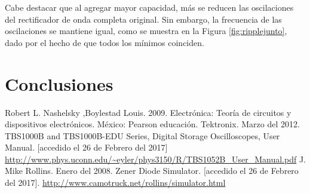 \documentclass[twoside,twocolumn,a4paper]{article}
\begin{document}
Cabe destacar que al agregar mayor capacidad, m\'as se reducen las oscilaciones del rectificador de onda completa original. Sin embargo, la frecuencia de las oscilaciones se mantiene igual, como se muestra en la Figura \ref{fig:ripplejunto}, dado por el hecho de que todos los m\'inimos coinciden. 



\section{Conclusiones}



\begin{thebibliography}{99} %

 Robert L. Nashelsky ,Boylestad Louis. 2009. Electr\'onica: Teor\'ia de circuitos y dispositivos electr\'onicos. M\'exico: Pearson educaci\'on.  
 Tektronix. Marzo del 2012. TBS1000B and TBS1000B-EDU Series, Digital Storage Oscilloscopes, User Manual. [accedido el 26 de Febrero del 2017] \url{http://www.phys.uconn.edu/~eyler/phys3150/R/TBS1052B_User_Manual.pdf}
 J. Mike Rollins. Enero del 2008. Zener Diode Simulator. [accedido el 26 de Febrero del 2017]. \url{http://www.camotruck.net/rollins/simulator.html}
 
\end{thebibliography}

\end{document}
